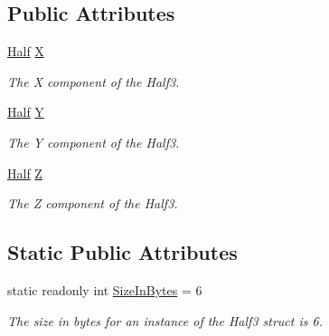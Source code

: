 \subsection*{Public Attributes}
\begin{DoxyCompactItemize}
\item 
\hyperlink{struct_open_t_k_1_1_half}{Half} \hyperlink{struct_open_t_k_1_1_vector3h_a3ddede79fc645c3cf8798c5333241082}{X}
\begin{DoxyCompactList}\small\item\em The X component of the Half3.\end{DoxyCompactList}\item 
\hyperlink{struct_open_t_k_1_1_half}{Half} \hyperlink{struct_open_t_k_1_1_vector3h_acfde1ca81a6ea60fea78e4baf2f7ea6e}{Y}
\begin{DoxyCompactList}\small\item\em The Y component of the Half3.\end{DoxyCompactList}\item 
\hyperlink{struct_open_t_k_1_1_half}{Half} \hyperlink{struct_open_t_k_1_1_vector3h_a78817af944696985fde275c56bd905ea}{Z}
\begin{DoxyCompactList}\small\item\em The Z component of the Half3.\end{DoxyCompactList}\end{DoxyCompactItemize}
\subsection*{Static Public Attributes}
\begin{DoxyCompactItemize}
\item 
static readonly int \hyperlink{struct_open_t_k_1_1_vector3h_a60936d86d094e2701a6bd1b758e9f62f}{Size\-In\-Bytes} = 6
\begin{DoxyCompactList}\small\item\em The size in bytes for an instance of the Half3 struct is 6.\end{DoxyCompactList}\end{DoxyCompactItemize}
